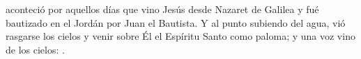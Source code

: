  aconteció por aquellos días que vino Jesús desde Nazaret de Galilea y fué bautizado en el Jordán por Juan el Bautista.
Y al punto subiendo del agua, vió rasgarse los cielos y venir sobre Él el Espíritu Santo como paloma; y una voz vino de los cielos:
.